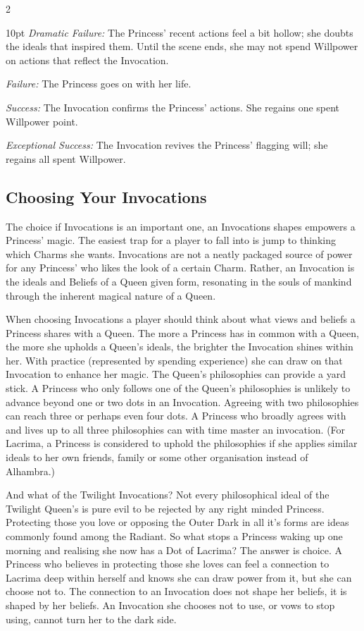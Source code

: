 \begin{multicols}{2}
 \begin{myindentpar}{10pt}
    \emph{Dramatic Failure:}  The Princess’ recent actions feel a bit hollow; she doubts the ideals that inspired them. Until the scene ends, she may not spend Willpower on actions that reflect the Invocation.

    \emph{Failure:} The Princess goes on with her life.

    \emph{Success:} The Invocation confirms the Princess’ actions. She regains one spent Willpower point.

    \emph{Exceptional Success:} The Invocation revives the Princess’ flagging will; she regains all spent Willpower.
\end{myindentpar}

\subsection*{Choosing Your Invocations}

The choice if Invocations is an important one, an Invocations shapes empowers a Princess' magic. The easiest trap for a player to fall into is jump to thinking which Charms she wants. Invocations are not a neatly packaged source of power for any Princess' who likes the look of a certain Charm. Rather, an Invocation is the ideals and Beliefs of a Queen given form, resonating in the souls of mankind through the inherent magical nature of a Queen.

When choosing Invocations a player should think about what views and beliefs a Princess shares with a Queen. The more a Princess has in common with a Queen, the more she upholds a Queen's ideals, the brighter the Invocation shines within her. With practice (represented by spending experience) she can draw on that Invocation to enhance her magic. The Queen's philosophies can provide a yard stick. A Princess who only follows one of the Queen's philosophies is unlikely to advance beyond one or two dots in an Invocation. Agreeing with two philosophies can reach three or perhaps even four dots. A Princess who broadly agrees with and lives up to all three philosophies can with time master an invocation. (For Lacrima, a Princess is considered to uphold the philosophies if she applies similar ideals to her own friends, family or some other organisation instead of Alhambra.)

And what of the Twilight Invocations? Not every philosophical ideal of the Twilight Queen's is pure evil to be rejected by any right minded Princess. Protecting those you love or opposing the Outer Dark in all it's forms are ideas commonly found among the Radiant. So what stops a Princess waking up one morning and realising she now has a Dot of Lacrima? The answer is choice. A Princess who believes in protecting those she loves can feel a connection to Lacrima deep within herself and knows she can draw power from it, but she can choose not to. The connection to an Invocation does not shape her beliefs, it is shaped by her beliefs. An Invocation she chooses not to use, or vows to stop using, cannot turn her to the dark side. 







\end{multicols}
